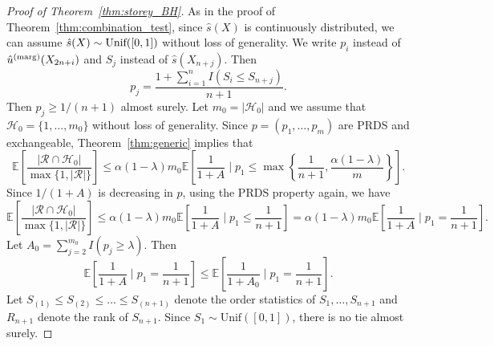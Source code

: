 \documentclass[11pt]{article}
\newcommand{\Unif}{\textnormal{Unif}}
\def\E{\mathbb{E}}
\def\marg{\textnormal{(marg)}}
\begin{document}
\begin{proof}[Proof of Theorem~\ref{thm:storey_BH}]
As in the proof of Theorem~\ref{thm:combination_test}, since $\hat{s}(X)$ is continuously distributed, we can assume $\hat{s}(X)\sim \Unif([0, 1])$ without loss of generality. We write $p_i$ instead of $\hat{u}^\marg(X_{2n+i})$ and $S_j$ instead of $\hat{s}(X_{n+j})$. Then
\[p_j = \frac{1 + \sum_{i=1}^{n}I(S_{i}\le S_{n+j})}{n + 1}.\]
Then $p_j\ge 1 / (n + 1)$ almost surely. Let $m_0 = |\mathcal{H}_0|$ and we assume that $\mathcal{H}_0 = \{1, \ldots, m_0\}$ without loss of generality. Since $p = (p_1, \ldots, p_m)$ are PRDS and exchangeable, Theorem~\ref{thm:generic} implies that
\[\E\left[\frac{|\mathcal{R} \cap \mathcal{H}_0|}{\max\{1, |\mathcal{R}|\} } \right]\le \alpha(1 - \lambda)m_0\E\left[\frac{1}{1 + A}\mid p_1\le \max\left\{\frac{1}{n+1}, \frac{\alpha(1 - \lambda)}{m}\right\}\right].\]
Since $1 / (1 + A)$ is decreasing in $p$, using the PRDS property again, we have
\begin{equation}
  \label{eq:fdr_conformal}
  \E\left[\frac{|\mathcal{R} \cap \mathcal{H}_0|}{\max\{1, |\mathcal{R}|\} } \right]\le \alpha(1 - \lambda)m_0\E\left[\frac{1}{1 + A}\mid p_1\le \frac{1}{n+1}\right] = \alpha(1 - \lambda)m_0\E\left[\frac{1}{1 + A}\mid p_1 = \frac{1}{n+1}\right].
\end{equation}
Let $A_0 = \sum_{j=2}^{m_0}I(p_j \ge \lambda)$. Then
\[\E\left[\frac{1}{1 + A}\mid p_1 = \frac{1}{n+1}\right]\le \E\left[\frac{1}{1 + A_0}\mid p_1 = \frac{1}{n+1}\right].\]
Let $S_{(1)}\le S_{(2)}\le \ldots \le S_{(n+1)}$ denote the order statistics of $S_1, \ldots, S_{n+1}$ and $R_{n+1}$ denote the rank of $S_{n+1}$. Since $S_1\sim \mathrm{Unif}([0, 1])$, there is no tie almost surely.


\end{proof}
\end{document}
